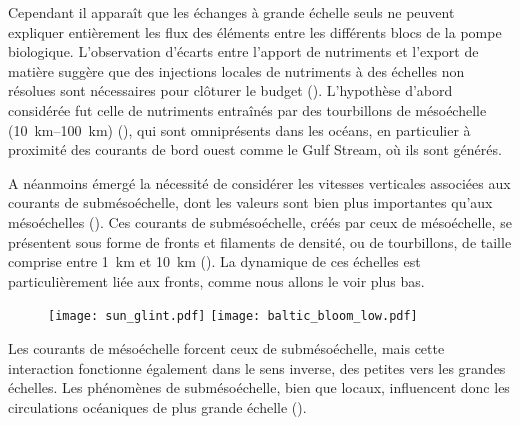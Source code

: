 Cependant il apparaît que les échanges à grande échelle seuls ne peuvent expliquer entièrement les flux des éléments entre les différents blocs de la pompe biologique.
L'observation d'écarts entre l'apport de nutriments et l'export de matière  suggère que des injections locales de nutriments à des échelles non résolues sont nécessaires pour clôturer le budget (\cite{mcgillicuddy_1998,oschlies_2002}).
L'hypothèse d'abord considérée fut celle de nutriments entraînés par des tourbillons de mésoéchelle (\qtyrange{10}{100}{\km}) (\cite{mcgillicuddy_2016}), qui sont omniprésents dans les océans, en particulier à proximité des courants de bord ouest comme le Gulf Stream, où ils sont générés.

A néanmoins émergé la nécessité de considérer les vitesses verticales associées aux courants de submésoéchelle, dont les valeurs sont bien plus importantes qu'aux mésoéchelles (\cite{klein_2009}).
Ces courants de submésoéchelle, créés par ceux de mésoéchelle, se présentent sous forme de fronts et filaments de densité, ou de tourbillons, de taille comprise entre \qty{1}{\km} et \qty{10}{\km} ().
La dynamique de ces échelles est particulièrement liée aux fronts, comme nous allons le voir plus bas.

\begin{figure}
  \centering
  \centerline{%
    \texttt{[image: sun\_glint.pdf]}%
    \hspace{1pt}%
    \texttt{[image: baltic\_bloom\_low.pdf]}%
  }
  \label{fig:finescales-photos}
\end{figure}

Les courants de mésoéchelle forcent ceux de submésoéchelle, mais cette interaction fonctionne également dans le sens inverse, des petites vers les grandes échelles.
Les phénomènes de submésoéchelle, bien que locaux, influencent donc les circulations océaniques de plus grande échelle (\cite{sasaki_2020,balwada_2022,naveiragarabato_2022,taylor_2023}).

